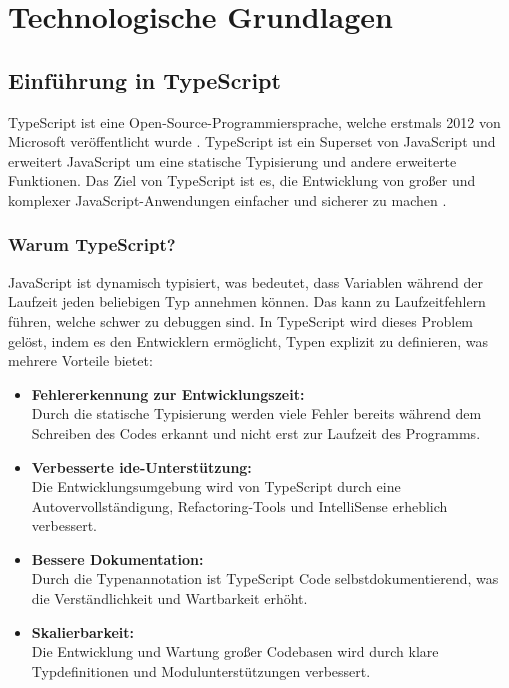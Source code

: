 \newpage
\section{Technologische Grundlagen}
\subsection[Einführung in TypeScript]{Einführung in TypeScript}
TypeScript ist eine Open-Source-Programmiersprache, welche erstmals 2012 von Microsoft veröffentlicht wurde \cite{typescript_docu}.
TypeScript ist ein Superset von JavaScript und erweitert JavaScript um eine statische Typisierung und andere erweiterte Funktionen.
Das Ziel von TypeScript ist es, die Entwicklung von großer und komplexer JavaScript-Anwendungen einfacher und sicherer zu machen \cite{why_typescript}.
\subsubsection[Warum TypeScript?]{Warum TypeScript?}
JavaScript ist dynamisch typisiert, was bedeutet, dass Variablen während der Laufzeit jeden beliebigen Typ annehmen können. Das kann zu Laufzeitfehlern führen, welche schwer zu debuggen sind.
In TypeScript wird dieses Problem gelöst, indem es den Entwicklern ermöglicht, Typen explizit zu definieren, was mehrere Vorteile bietet:

\begin{itemize}
    \item \textbf{Fehlererkennung zur Entwicklungszeit:} \\   Durch die statische Typisierung werden viele Fehler bereits während dem Schreiben des Codes erkannt und nicht erst zur Laufzeit des Programms.
    \item \textbf{Verbesserte \gls{ide}-Unterstützung:} \\    Die Entwicklungsumgebung wird von TypeScript durch eine Autovervollständigung, Refactoring-Tools und IntelliSense erheblich verbessert. \cite{typescript_in_vscode}
    \item \textbf{Bessere Dokumentation:} \\     Durch die Typenannotation ist TypeScript Code selbstdokumentierend, was die Verständlichkeit und Wartbarkeit erhöht.
    \item \textbf{Skalierbarkeit:} \\   Die Entwicklung und Wartung großer Codebasen wird durch klare Typdefinitionen und Modulunterstützungen verbessert.  
\end{itemize}

